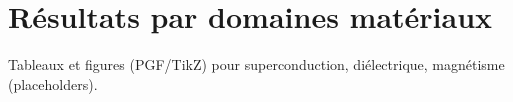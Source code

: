 
\section{Résultats par domaines matériaux}
Tableaux et figures (PGF/TikZ) pour superconduction, diélectrique, magnétisme (placeholders).